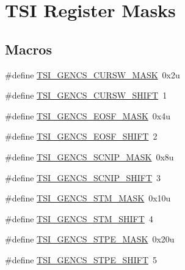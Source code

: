 \hypertarget{group___t_s_i___register___masks}{}\section{T\+SI Register Masks}
\label{group___t_s_i___register___masks}
\subsection*{Macros}
\begin{DoxyCompactItemize}
\item 
\#define \hyperlink{group___t_s_i___register___masks_gafd7d98d809a1d17c59cc86addc5fe801}{T\+S\+I\+\_\+\+G\+E\+N\+C\+S\+\_\+\+C\+U\+R\+S\+W\+\_\+\+M\+A\+SK}~0x2u
\item 
\#define \hyperlink{group___t_s_i___register___masks_gadcd854b12f8b747a492eac3e88522b1e}{T\+S\+I\+\_\+\+G\+E\+N\+C\+S\+\_\+\+C\+U\+R\+S\+W\+\_\+\+S\+H\+I\+FT}~1
\item 
\#define \hyperlink{group___t_s_i___register___masks_ga820de7fe1ecba9a42260e304554b389f}{T\+S\+I\+\_\+\+G\+E\+N\+C\+S\+\_\+\+E\+O\+S\+F\+\_\+\+M\+A\+SK}~0x4u
\item 
\#define \hyperlink{group___t_s_i___register___masks_ga9a2e8c68bfb60312ebdeea4f069d9086}{T\+S\+I\+\_\+\+G\+E\+N\+C\+S\+\_\+\+E\+O\+S\+F\+\_\+\+S\+H\+I\+FT}~2
\item 
\#define \hyperlink{group___t_s_i___register___masks_gaf7212a89bc45902f2ed4cee12a1ceb92}{T\+S\+I\+\_\+\+G\+E\+N\+C\+S\+\_\+\+S\+C\+N\+I\+P\+\_\+\+M\+A\+SK}~0x8u
\item 
\#define \hyperlink{group___t_s_i___register___masks_ga372b92d46c9f071d4fdee3edcc0d5219}{T\+S\+I\+\_\+\+G\+E\+N\+C\+S\+\_\+\+S\+C\+N\+I\+P\+\_\+\+S\+H\+I\+FT}~3
\item 
\#define \hyperlink{group___t_s_i___register___masks_ga490fa9afb2591596712216cc7031cd47}{T\+S\+I\+\_\+\+G\+E\+N\+C\+S\+\_\+\+S\+T\+M\+\_\+\+M\+A\+SK}~0x10u
\item 
\#define \hyperlink{group___t_s_i___register___masks_ga4e08b4560fff0d44559e8dd48afcb4b0}{T\+S\+I\+\_\+\+G\+E\+N\+C\+S\+\_\+\+S\+T\+M\+\_\+\+S\+H\+I\+FT}~4
\item 
\#define \hyperlink{group___t_s_i___register___masks_ga83a2e8e8965873c67507422e6e9a9b8e}{T\+S\+I\+\_\+\+G\+E\+N\+C\+S\+\_\+\+S\+T\+P\+E\+\_\+\+M\+A\+SK}~0x20u
\item 
\#define \hyperlink{group___t_s_i___register___masks_gab11b995ab664e22700a2f67aa2b1a070}{T\+S\+I\+\_\+\+G\+E\+N\+C\+S\+\_\+\+S\+T\+P\+E\+\_\+\+S\+H\+I\+FT}~5

\end{DoxyCompactItemize}
